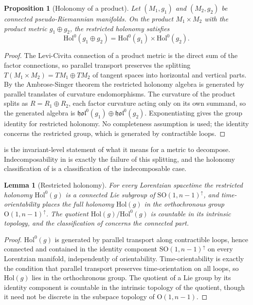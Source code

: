\documentclass[11pt,letterpaper]{article}
\newtheorem{proposition}[theorem]{Proposition}
\newtheorem{lemma}[theorem]{Lemma}
\theoremstyle{definition}
\theoremstyle{remark}
\begin{document}
\begin{proposition}[Holonomy of a product]\label{prop:product}
Let $(M_1, g_1)$ and $(M_2, g_2)$ be connected pseudo-Riemannian manifolds. On the product $M_1 \times M_2$ with the product metric $g_1 \oplus g_2$, the restricted holonomy satisfies
\[
\mathrm{Hol}^0(g_1 \oplus g_2) = \mathrm{Hol}^0(g_1) \times \mathrm{Hol}^0(g_2).
\]
\end{proposition}

\begin{proof}
The Levi-Civita connection of a product metric is the direct sum of the factor connections, so parallel transport preserves the splitting $T(M_1 \times M_2) = TM_1 \oplus TM_2$ of tangent spaces into horizontal and vertical parts. By the Ambrose-Singer theorem the restricted holonomy algebra is generated by parallel translates of curvature endomorphisms. The curvature of the product splits as $R = R_1 \oplus R_2$, each factor curvature acting only on its own summand, so the generated algebra is $\mathfrak{hol}^0(g_1) \oplus \mathfrak{hol}^0(g_2)$. Exponentiating gives the group identity for restricted holonomy. No completeness assumption is used; the identity concerns the restricted group, which is generated by contractible loops.
\end{proof}

 is the invariant-level statement of what it means for a metric to decompose. Indecomposability in  is exactly the failure of this splitting, and the holonomy classification of  is a classification of the indecomposable case.

\begin{lemma}[Restricted holonomy]\label{lem:restricted}
For every Lorentzian spacetime the restricted holonomy $\mathrm{Hol}^0(g)$ is a connected Lie subgroup of $\mathrm{SO}(1,n-1)^{\uparrow}$, and time-orientability places the full holonomy $\mathrm{Hol}(g)$ in the orthochronous group $\mathrm{O}(1,n-1)^{\uparrow}$. The quotient $\mathrm{Hol}(g)/\mathrm{Hol}^0(g)$ is countable in its intrinsic topology, and the classification of  concerns the connected part.
\end{lemma}

\begin{proof}
$\mathrm{Hol}^0(g)$ is generated by parallel transport along contractible loops, hence connected and contained in the identity component $\mathrm{SO}(1,n-1)^{\uparrow}$ on every Lorentzian manifold, independently of orientability. Time-orientability is exactly the condition that parallel transport preserves time-orientation on all loops, so $\mathrm{Hol}(g)$ lies in the orthochronous group. The quotient of a Lie group by its identity component is countable in the intrinsic topology of the quotient, though it need not be discrete in the subspace topology of $\mathrm{O}(1,n-1)$.
\end{proof}
\end{document}
